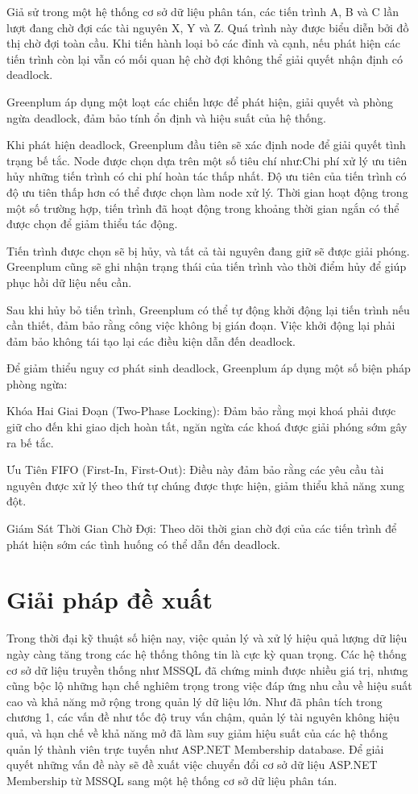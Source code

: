\documentclass{article}[14pt]
\begin{document}
Giả sử trong một hệ thống cơ sở dữ liệu phân tán, các tiến trình A, B và C lần lượt đang chờ đợi các tài nguyên X, Y và Z. Quá trình này được biểu diễn bởi đồ thị chờ đợi toàn cầu. Khi tiến hành loại bỏ các đỉnh và cạnh, nếu phát hiện các tiến trình còn lại vẫn có mối quan hệ chờ đợi không thể giải quyết nhận định có deadlock.

Greenplum áp dụng một loạt các chiến lược để phát hiện, giải quyết và phòng ngừa deadlock, đảm bảo tính ổn định và hiệu suất của hệ thống.

Khi phát hiện deadlock, Greenplum đầu tiên sẽ xác định node để giải quyết tình trạng bế tắc. Node được chọn dựa trên một số tiêu chí như:Chi phí xử lý ưu tiên hủy những tiến trình có chi phí hoàn tác thấp nhất. Độ ưu tiên của tiến trình có độ ưu tiên thấp hơn có thể được chọn làm node xử lý. Thời gian hoạt động trong một số trường hợp, tiến trình đã hoạt động trong khoảng thời gian ngắn có thể được chọn để giảm thiểu tác động.

Tiến trình được chọn sẽ bị hủy, và tất cả tài nguyên đang giữ sẽ được giải phóng. Greenplum cũng sẽ ghi nhận trạng thái của tiến trình vào thời điểm hủy để giúp phục hồi dữ liệu nếu cần.

Sau khi hủy bỏ tiến trình, Greenplum có thể tự động khởi động lại tiến trình nếu cần thiết, đảm bảo rằng công việc không bị gián đoạn. Việc khởi động lại phải đảm bảo không tái tạo lại các điều kiện dẫn đến deadlock.

Để giảm thiểu nguy cơ phát sinh deadlock, Greenplum áp dụng một số biện pháp phòng ngừa:

Khóa Hai Giai Đoạn (Two-Phase Locking): Đảm bảo rằng mọi khoá phải được giữ cho đến khi giao dịch hoàn tất, ngăn ngừa các khoá được giải phóng sớm gây ra bế tắc.

Ưu Tiên FIFO (First-In, First-Out): Điều này đảm bảo rằng các yêu cầu tài nguyên được xử lý theo thứ tự chúng được thực hiện, giảm thiểu khả năng xung đột.

Giám Sát Thời Gian Chờ Đợi: Theo dõi thời gian chờ đợi của các tiến trình để phát hiện sớm các tình huống có thể dẫn đến deadlock.




\section{Giải pháp đề xuất}

Trong thời đại kỹ thuật số hiện nay, việc quản lý và xử lý hiệu quả lượng dữ liệu ngày càng tăng trong các hệ thống thông tin là cực kỳ quan trọng. Các hệ thống cơ sở dữ liệu truyền thống như MSSQL đã chứng minh được nhiều giá trị, nhưng cũng bộc lộ những hạn chế nghiêm trọng trong việc đáp ứng nhu cầu về hiệu suất cao và khả năng mở rộng trong quản lý dữ liệu lớn. Như đã phân tích trong chương 1, các vấn đề như tốc độ truy vấn chậm, quản lý tài nguyên không hiệu quả, và hạn chế về khả năng mở đã làm suy giảm hiệu suất của các hệ thống quản lý thành viên trực tuyến như ASP.NET Membership database. Để giải quyết những vấn đề này sẽ đề xuất việc chuyển đổi cơ sở dữ liệu ASP.NET Membership từ MSSQL sang một hệ thống cơ sở dữ liệu phân tán.
\end{document}
